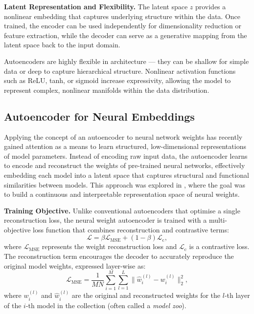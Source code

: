 \vspace{0.5em}
\noindent
\textbf{Latent Representation and Flexibility.}
The latent space $z$ provides a nonlinear embedding that captures underlying structure within the data. Once trained, the encoder can be used independently for dimensionality reduction or feature extraction, while the decoder can serve as a generative mapping from the latent space back to the input domain.

Autoencoders are highly flexible in architecture — they can be shallow for simple data or deep to capture hierarchical structure. Nonlinear activation functions such as ReLU, tanh, or sigmoid increase expressivity, allowing the model to represent complex, nonlinear manifolds within the data distribution.

\subsection{Autoencoder for Neural Embeddings}
Applying the concept of an autoencoder to neural network weights has recently gained attention as a means to learn structured, low-dimensional representations of model parameters. Instead of encoding raw input data, the autoencoder learns to encode and reconstruct the weights of pre-trained neural networks, effectively embedding each model into a latent space that captures structural and functional similarities between models. This approach was explored in \cite{NEURIPS2022_b2c4b7d3}, where the goal was to build a continuous and interpretable representation space of neural weights.

\vspace{0.5em}
\noindent
\textbf{Training Objective.}
Unlike conventional autoencoders that optimise a single reconstruction loss, the neural weight autoencoder is trained with a multi-objective loss function that combines reconstruction and contrastive terms:
\begin{equation}
\mathcal{L} = \beta \mathcal{L}_{\text{MSE}} + (1 - \beta) \mathcal{L}_{\text{c}},
\label{eq:multi_loss}
\end{equation}
where $\mathcal{L}_{\text{MSE}}$ represents the weight reconstruction loss and $\mathcal{L}_{\text{c}}$ is a contrastive loss.  
The reconstruction term encourages the decoder to accurately reproduce the original model weights, expressed layer-wise as:
\begin{equation}
\mathcal{L}_{\text{MSE}} = \frac{1}{MN} \sum_{i=1}^{M} \sum_{l=1}^{L} \| \hat{w}_i^{(l)} - w_i^{(l)} \|_2^2,
\label{eq:weight_recon_loss}
\end{equation}
where $w_i^{(l)}$ and $\hat{w}_i^{(l)}$ are the original and reconstructed weights for the $l$-th layer of the $i$-th model in the collection (often called a \textit{model zoo}).  

